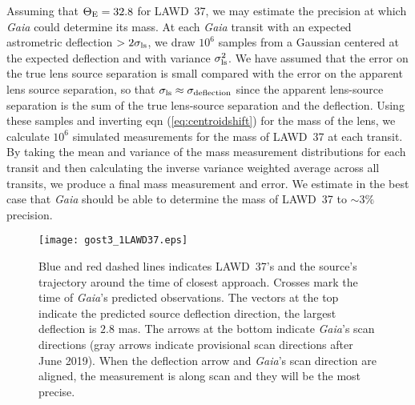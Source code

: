 \documentclass[fleqn,usenatbib]{mnras}
\newcommand{\ThetaE}{{\Theta_{\rm E}}}
\newcommand{\Gaia}{{\it Gaia }}
\begin{document}
Assuming that $\ThetaE = 32.8$ for LAWD~37, we may estimate the precision at which \Gaia could determine its mass. At each \Gaia transit with an expected astrometric deflection $> 2 \sigma_{\rm ls}$, we draw $10^{6}$ samples from a Gaussian centered at the expected deflection and with variance $\sigma^{2}_{\rm ls}$. We have assumed that the error on the true lens source separation is small compared with the error on the apparent lens source separation, so that $\sigma_{\rm ls} \approx{} \sigma_{\text{deflection}}$ since the apparent lens-source separation is the sum of the true lens-source separation and the deflection. Using these samples and inverting eqn (\ref{eq:centroidshift}) for the mass of the lens, we calculate $10^{6}$ simulated measurements for the mass of LAWD~37 at each transit. By taking the mean and variance of the mass measurement distributions for each transit and then calculating the inverse variance weighted average across all transits, we produce a final mass measurement and error. We estimate in the best case that \Gaia should be able to determine the mass of LAWD~37 to $\sim3\%$ precision.




\begin{figure}
\texttt{[image: gost3\_1LAWD37.eps]}
\caption{Blue and red dashed lines indicates LAWD~37's and the source's trajectory around the time of closest approach. Crosses mark the time of {\it Gaia}'s predicted observations. The vectors at the top indicate the predicted source deflection direction, the largest deflection is $2.8$ mas. The arrows at the bottom indicate {\it Gaia}'s scan directions (gray arrows indicate provisional scan directions after June 2019). When the deflection arrow and {\it Gaia}'s scan direction are aligned, the measurement is along scan and they will be the most precise.}
\label{fig:gost}
\end{figure}
\end{document}
